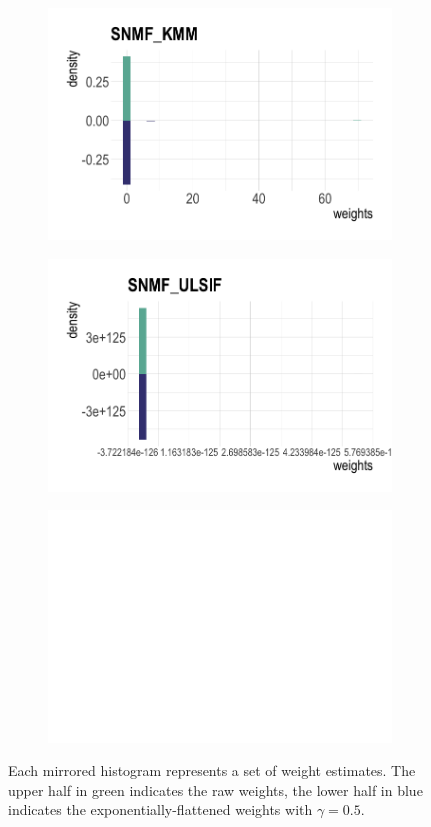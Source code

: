 \documentclass[a4paper,12pt]{article}
\begin{document}
\begin{figure}[H]
\begin{subfigure}{.32\textwidth}
  \label{fig:sfig2}
\end{subfigure} 
\begin{subfigure}{.32\textwidth}
  \centering
  \includegraphics[width=\linewidth]{toy13.png}
  \label{fig:sfig2}
\end{subfigure} %
\begin{subfigure}{.32\textwidth}
  \centering
  \includegraphics[width=\linewidth]{toy14.png}
  \label{fig:sfig1}
\end{subfigure}%
\begin{subfigure}{.32\textwidth}
  \centering
  \includegraphics[width=.6\linewidth]{toy15.png}
  \label{fig:sfig2}
\end{subfigure} %
\caption{Each mirrored histogram represents a set of weight estimates. The upper half in green indicates the raw weights, the lower half in blue indicates the exponentially-flattened weights with $\gamma = 0.5$.}
\label{sim_den}
\end{figure} 
\end{document}
